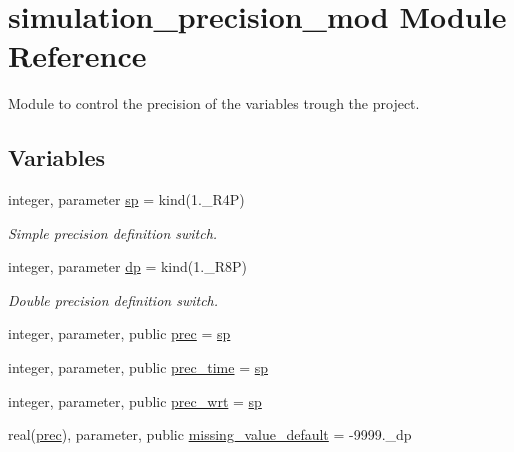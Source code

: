 \hypertarget{namespacesimulation__precision__mod}{}\section{simulation\+\_\+precision\+\_\+mod Module Reference}
\label{namespacesimulation__precision__mod}


Module to control the precision of the variables trough the project.  


\subsection*{Variables}
\begin{DoxyCompactItemize}
\item 
integer, parameter \hyperlink{namespacesimulation__precision__mod_a15b1ab993f9b11430e9d9d3dc6c77614}{sp} = kind(1.\+\_\+\+R4P)
\begin{DoxyCompactList}\small\item\em Simple precision definition switch. \end{DoxyCompactList}\item 
integer, parameter \hyperlink{namespacesimulation__precision__mod_a4d49b0033a5e2bc6693c5b2dfb63a032}{dp} = kind(1.\+\_\+\+R8P)
\begin{DoxyCompactList}\small\item\em Double precision definition switch. \end{DoxyCompactList}\item 
integer, parameter, public \hyperlink{namespacesimulation__precision__mod_aaff1ddf996761a1e11e787d63e1612f6}{prec} = \hyperlink{namespacesimulation__precision__mod_a15b1ab993f9b11430e9d9d3dc6c77614}{sp}
\item 
integer, parameter, public \hyperlink{namespacesimulation__precision__mod_a3833ad1bc52c3738ac861591b7492737}{prec\+\_\+time} = \hyperlink{namespacesimulation__precision__mod_a15b1ab993f9b11430e9d9d3dc6c77614}{sp}
\item 
integer, parameter, public \hyperlink{namespacesimulation__precision__mod_ad515822198607dfee68a6ed8b246c7da}{prec\+\_\+wrt} = \hyperlink{namespacesimulation__precision__mod_a15b1ab993f9b11430e9d9d3dc6c77614}{sp}
\item 
real(\hyperlink{namespacesimulation__precision__mod_aaff1ddf996761a1e11e787d63e1612f6}{prec}), parameter, public \hyperlink{namespacesimulation__precision__mod_a1fb0f91226452bb43d4c61cae32a9a6d}{missing\+\_\+value\+\_\+default} = -\/9999.\+\_\+dp

\end{DoxyCompactItemize}
